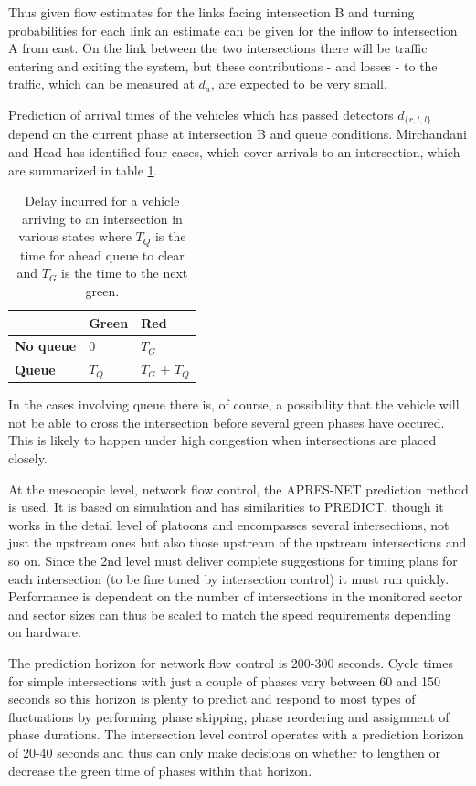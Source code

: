 Thus given flow estimates for the links facing intersection B and turning probabilities for each link an estimate can be given for the inflow to intersection A from east. On the link between the two intersections there will be traffic entering and exiting the system, but these contributions - and losses - to the traffic, which can be measured at $d_a$, are expected to be very small.

Prediction of arrival times of the vehicles which has passed detectors $d_{\lbrace r,t,l \rbrace}$ depend on the current phase at intersection B and queue conditions. Mirchandani and Head has identified four cases, which cover arrivals to an intersection, which are summarized in table \ref{tbl:delaycases}.

\begin{table}[!ht]
\begin{center}
\begin{tabular}{l|ll}
 & \textbf{Green} & \textbf{Red} \\ \hline
\textbf{No queue} & 0 & $T_G$ \\
\textbf{Queue} & $T_Q$ & $T_G$ + $T_Q$
\end{tabular}
\end{center}
\caption{Delay incurred for a vehicle arriving to an intersection in various states where $T_Q$ is the time for ahead queue to clear and $T_G$ is the time to the next green.}
\label{tbl:delaycases}
\end{table}

In the cases involving queue there is, of course, a possibility that the vehicle will not be able to cross the intersection before several green phases have occured. This is likely to happen under high congestion when intersections are placed closely.

At the mesocopic level, network flow control, the APRES-NET prediction method is used. It is based on simulation and has similarities to PREDICT, though it works in the detail level of platoons and encompasses several intersections, not just the upstream ones but also those upstream of the upstream intersections and so on. Since the 2nd level must deliver complete suggestions for timing plans for each intersection (to be fine tuned by intersection control) it must run quickly. Performance is dependent on the number of intersections in the monitored sector and sector sizes can thus be scaled to match the speed requirements depending on hardware.

The prediction horizon for network flow control is 200-300 seconds. Cycle times for simple intersections with just a couple of phases vary between 60 and 150 seconds so this horizon is plenty to predict and respond to most types of fluctuations by performing phase skipping, phase reordering and assignment of phase durations. The intersection level control operates with a prediction horizon of 20-40 seconds and thus can only make decisions on whether to lengthen or decrease the green time of phases within that horizon.

